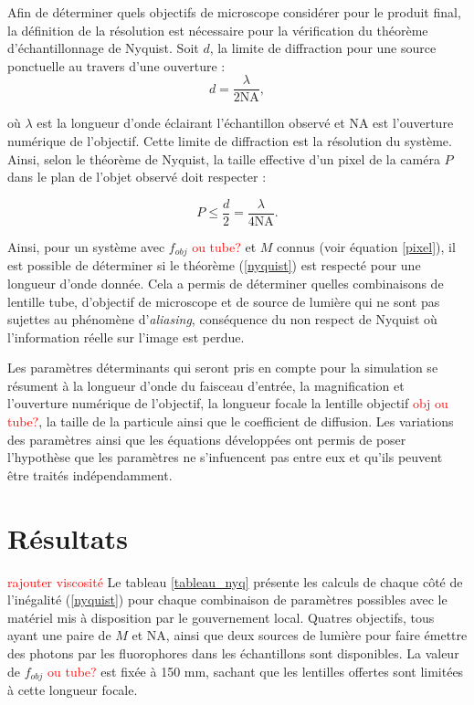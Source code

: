 \documentclass[conference]{IEEEtran}
\begin{document}
Afin de déterminer quels objectifs de microscope considérer pour le produit final, la définition
de la résolution est nécessaire pour la vérification du théorème d'échantillonnage de Nyquist. Soit $d$,
la limite de diffraction pour une source ponctuelle au travers d'une ouverture \cite{video}:
\begin{equation}
  d = \frac{\lambda}{2 \text{NA}},
\end{equation}

où $\lambda$ est la longueur d'onde éclairant l'échantillon observé et NA est l'ouverture numérique de
l'objectif. Cette limite de diffraction est la résolution du système. Ainsi, selon le théorème
de Nyquist, la taille effective d'un pixel de la caméra $P$ dans le plan de l'objet observé doit respecter :

\begin{equation}\label{nyquist}
  P \leq \frac{d}{2} = \frac{\lambda}{4 \text{NA} }.
\end{equation}


Ainsi, pour un système avec $f_{obj}$ \textcolor{red}{ou tube?} et $M$ connus (voir équation \ref{pixel}), il est possible de déterminer si le théorème 
(\ref{nyquist}) est respecté pour une longueur d'onde donnée. Cela a permis de déterminer quelles 
combinaisons de lentille tube, d'objectif de microscope et de source de lumière qui ne sont pas 
sujettes au phénomène d'\textit{aliasing}, conséquence du non respect de Nyquist où l'information
réelle sur l'image est perdue.

Les paramètres déterminants qui seront pris en compte pour la simulation se résument à la longueur d'onde du faisceau d'entrée,
la magnification et l'ouverture numérique de l'objectif, la longueur focale la lentille objectif \textcolor{red}{obj ou tube?}, la taille de la particule ainsi que le 
coefficient de diffusion. Les variations des paramètres ainsi que les équations
développées ont permis de poser l'hypothèse que les paramètres ne s'infuencent pas entre eux et qu'ils peuvent être traités indépendamment.




\section{Résultats \label{resultats}}
\textcolor{red}{rajouter viscosité} Le tableau \ref{tableau_nyq} présente les calculs de chaque côté de l'inégalité (\ref{nyquist}) pour
chaque combinaison de paramètres possibles avec le matériel mis à disposition par le gouvernement local.
Quatres objectifs, tous ayant une paire de $M$ et NA, ainsi que deux sources de lumière pour faire émettre
des photons par les fluorophores dans les échantillons sont disponibles. La valeur de $f_{obj}$ \textcolor{red}{ou tube?} est fixée à 150 mm, sachant que les lentilles offertes sont limitées à cette longueur focale.
\end{document}
